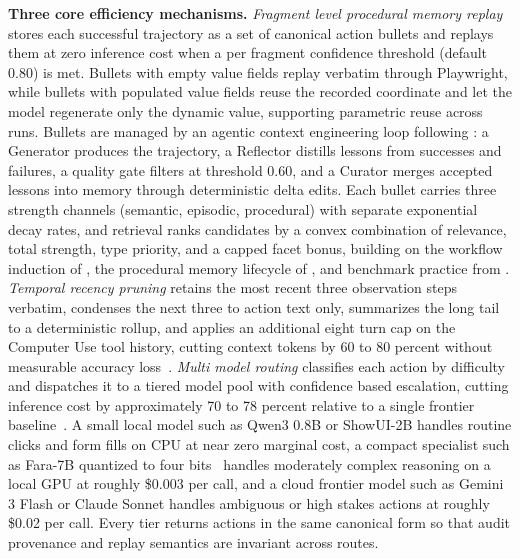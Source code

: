 \documentclass{article}
\theoremstyle{plain}
\theoremstyle{definition}
\theoremstyle{remark}
\begin{document}
\textbf{Three core efficiency mechanisms.}
\emph{Fragment level procedural memory replay} stores each successful trajectory as a set of canonical action bullets and replays them at zero inference cost when a per fragment confidence threshold (default 0.80) is met. Bullets with empty value fields replay verbatim through Playwright, while bullets with populated value fields reuse the recorded coordinate and let the model regenerate only the dynamic value, supporting parametric reuse across runs. Bullets are managed by an agentic context engineering loop following \citet{zhang2025ace}: a Generator produces the trajectory, a Reflector distills lessons from successes and failures, a quality gate filters at threshold 0.60, and a Curator merges accepted lessons into memory through deterministic delta edits. Each bullet carries three strength channels (semantic, episodic, procedural) with separate exponential decay rates, and retrieval ranks candidates by a convex combination of relevance, total strength, type priority, and a capped facet bonus, building on the workflow induction of \citet{wang2024awm}, the procedural memory lifecycle of \citet{fang2025memp}, and benchmark practice from \citet{xie2024osworld,zhou2023webarena}.
\emph{Temporal recency pruning} retains the most recent three observation steps verbatim, condenses the next three to action text only, summarizes the long tail to a deterministic rollup, and applies an additional eight turn cap on the Computer Use tool history, cutting context tokens by 60 to 80 percent without measurable accuracy loss~\cite{li2026pruning}.
\emph{Multi model routing} classifies each action by difficulty and dispatches it to a tiered model pool with confidence based escalation, cutting inference cost by approximately 70 to 78 percent relative to a single frontier baseline~\cite{liu2026avr}. A small local model such as Qwen3 0.8B or ShowUI-2B handles routine clicks and form fills on CPU at near zero marginal cost, a compact specialist such as Fara-7B quantized to four bits~\cite{fara7b2025} handles moderately complex reasoning on a local GPU at roughly \$0.003 per call, and a cloud frontier model such as Gemini 3 Flash or Claude Sonnet handles ambiguous or high stakes actions at roughly \$0.02 per call. Every tier returns actions in the same canonical form so that audit provenance and replay semantics are invariant across routes.
\end{document}
